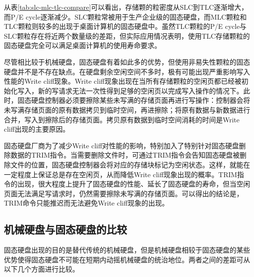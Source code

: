 \begin{enumerate}
从表\ref{tab:slc-mlc-tlc-compare}可以看出，存储颗的粒密度从SLC到TLC逐渐增大，而P/E cycle逐渐减少。SLC颗粒常被用于生产企业级的固态硬盘，而MLC颗粒和TLC颗粒则较多的出现于桌面计算机的固态硬盘中。虽然TLC颗粒的P/E cycle与SLC颗粒存在将近两个数量级的差距，但实际应用情况表明，使用TLC存储颗粒的固态硬盘完全可以满足桌面计算机的使用寿命要求。

尽管相比较于机械硬盘，固态硬盘有着如此多的优势，但使用非易失性颗粒的固态硬盘并不是不存在缺点。在硬盘剩余空闲空间不多时，极有可能出现严重影响写入性能的Write cliff现象。Write cliff现象出现在当所有存储颗粒的空闲页都已经被初始化写入，新的写请求无法一次性得到足够的空闲页以完成写入操作的情况下。此时，固态硬盘控制器必须要擦除某些未写满的存储页面再进行写操作：控制器会将未写满存储页面的原有数据拷贝到临时空间，再进擦除；将原有数据与新数据进行合并，写入到擦除后的存储页面。拷贝原有数据到临时空间消耗的时间是Write cliff出现的主要原因。

固态硬盘厂商为了减少Write cliff对性能的影响，特别加入了特别针对固态硬盘删除数据的TRIM指令。当需要删除文件时，可通过TRIM指令会告知固态硬盘被删除文件的位置，固态硬盘控制器会将对应的存储块标记为空闲状态。这样，就能在一定程度上保证总是存在空闲页，从而降低Write cliff现象出现的概率。TRIM指令的出现，很大程度上提升了固态硬盘的性能、延长了固态硬盘的寿命，但当空闲页面无法满足写请求时，仍然需要擦除未写满的存储页面。可以得出的结论是，TRIM命令只能推迟而无法避免Write cliff现象的出现。
\end{enumerate}

\subsection{机械硬盘与固态硬盘的比较}
固态硬盘出现的目的是替代传统的机械硬盘，但是机械硬盘相较于固态硬盘的某些优势使得固态硬盘不可能在短期内动摇机械硬盘的统治地位。两者之间的差距可从以下几个方面进行比较。

